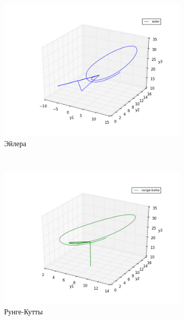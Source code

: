 \documentclass[oneside, final, 11pt]{article}
\begin{document}
\begin{figure}[h]
    \centering
    \begin{subfigure}[h]{0.45\textwidth}
        \includegraphics[width=\textwidth]{figure_5.png}
        \caption{Эйлера}
        \label{s1}
    \end{subfigure}
    ~
    \begin{subfigure}[h]{0.45\textwidth}
        \includegraphics[width=\textwidth]{figure_6.png}
        \caption{Рунге-Кутты}
        \label{s2}
    \end{subfigure}
     ~
    \begin{subfigure}[h]{1\textwidth}

\end{subfigure}
\end{figure}
\end{document}
